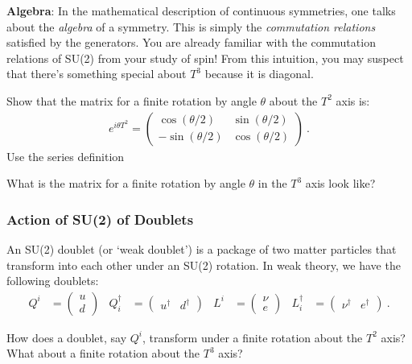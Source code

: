 \documentclass[12pt]{article}
\begin{document}
\begin{framed}
\noindent\textbf{Algebra}: In the mathematical description of continuous symmetries, one talks about the \emph{algebra} of a symmetry. This is simply the \emph{commutation relations} satisfied by the generators. You are already familiar with the commutation relations of SU(2) from your study of spin! From this intuition, you may suspect that there's something special about $T^3$ because it is diagonal. 
\end{framed}

Show that the matrix for a finite rotation by angle $\theta$ about the $T^2$ axis is:
\begin{align}
	e^{i\theta T^2} =
	\begin{pmatrix}
	\cos(\theta/2) & \sin(\theta/2)\\
	-\sin(\theta/2) & \cos(\theta/2)
	\end{pmatrix} \ .
\end{align}
Use the series definition %

What is the matrix for a finite rotation by angle $\theta$ in the $T^3$ axis look like?



\subsubsection{Action of SU(2) of Doublets}
An SU(2) doublet (or `weak doublet') is a package of two matter particles that transform into each other under an SU(2) rotation. In weak theory, we have the following doublets:
\begin{align}
	Q^i 
	&=
	\begin{pmatrix}
		u\\
		d
	\end{pmatrix}
	&
	Q^\dag_i &=
	\begin{pmatrix}
		u^\dag&
		d^\dag
	\end{pmatrix}
	&
	L^i 
	&=
	\begin{pmatrix}
		\nu\\
		e
	\end{pmatrix}
	&
	L^\dag_i &=
	\begin{pmatrix}
		\nu^\dag&
		e^\dag
	\end{pmatrix} \ .
\end{align}

How does a doublet, say $Q^i$, transform under a finite rotation about the $T^2$ axis? What about a finite rotation about the $T^3$ axis?
\end{document}
